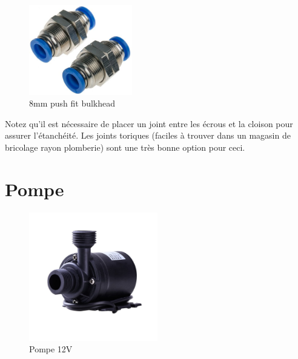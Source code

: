 \documentclass[a4paper, 11pt]{report}
\begin{document}
\begin{figure}[h]
\caption{8mm push fit bulkhead}

\centering{}\includegraphics[width=0.4\textwidth]{images/bulkhead}
\end{figure}

Notez qu'il est nécessaire de placer un joint entre les écrous et
la cloison pour assurer l'étanchéité. Les joints toriques (faciles
à trouver dans un magasin de bricolage rayon plomberie) sont une très
bonne option pour ceci.

\section{Pompe}

\begin{figure}[h]
\caption{Pompe 12V}

\centering{}\includegraphics[width=0.5\textwidth]{images/pompe}
\end{figure}
\end{document}
